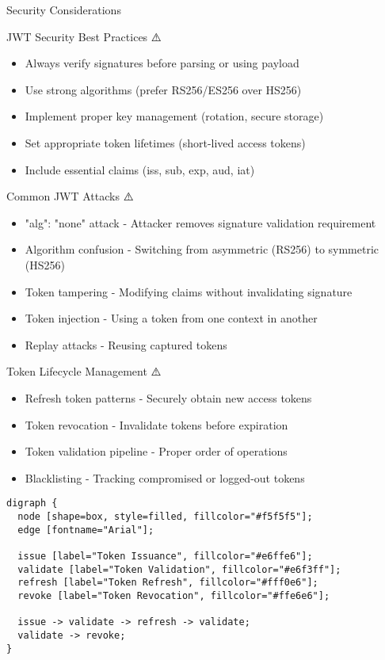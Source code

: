 \documentclass[presentation,aspectratio=169]{beamer}
\begin{document}
\begin{frame}[label={sec:orgeb1f650},fragile]{Security Considerations}
 \begin{block}{JWT Security Best Practices ⚠️}
\begin{itemize}[<+->]
\item \alert{Always verify signatures before parsing or using payload}
\item Use strong algorithms (prefer RS256/ES256 over HS256)
\item Implement proper key management (rotation, secure storage)
\item Set appropriate token lifetimes (short-lived access tokens)
\item Include essential claims (iss, sub, exp, aud, iat)
\end{itemize}
\end{block}
\begin{block}{Common JWT Attacks ⚠️}
\begin{itemize}[<+->]
\item \alert{"alg": "none" attack} - Attacker removes signature validation requirement
\item \alert{Algorithm confusion} - Switching from asymmetric (RS256) to symmetric (HS256)
\item \alert{Token tampering} - Modifying claims without invalidating signature
\item \alert{Token injection} - Using a token from one context in another
\item \alert{Replay attacks} - Reusing captured tokens
\end{itemize}
\end{block}
\begin{block}{Token Lifecycle Management ⚠️}
\begin{itemize}[<+->]
\item \alert{Refresh token patterns} - Securely obtain new access tokens
\item \alert{Token revocation} - Invalidate tokens before expiration
\item \alert{Token validation pipeline} - Proper order of operations
\item \alert{Blacklisting} - Tracking compromised or logged-out tokens
\end{itemize}

\begin{verbatim}
digraph {
  node [shape=box, style=filled, fillcolor="#f5f5f5"];
  edge [fontname="Arial"];

  issue [label="Token Issuance", fillcolor="#e6ffe6"];
  validate [label="Token Validation", fillcolor="#e6f3ff"];
  refresh [label="Token Refresh", fillcolor="#fff0e6"];
  revoke [label="Token Revocation", fillcolor="#ffe6e6"];

  issue -> validate -> refresh -> validate;
  validate -> revoke;
}
\end{verbatim}
\end{block}
\end{frame}
\end{document}

